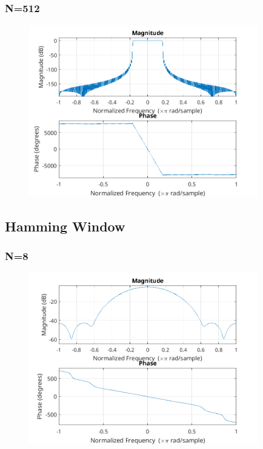 \documentclass{article}
\begin{document}
  \subsubsection{N=512}
  \begin{figure}[!ht]
  \includegraphics[width=10cm]{freqz_han_512.png}
  \end{figure}
\subsection{Hamming Window}
  \subsubsection{N=8}
  \begin{figure}[!ht]
  \includegraphics[width=10cm]{freqz_ham_8.png}
  \end{figure}
\end{document}
